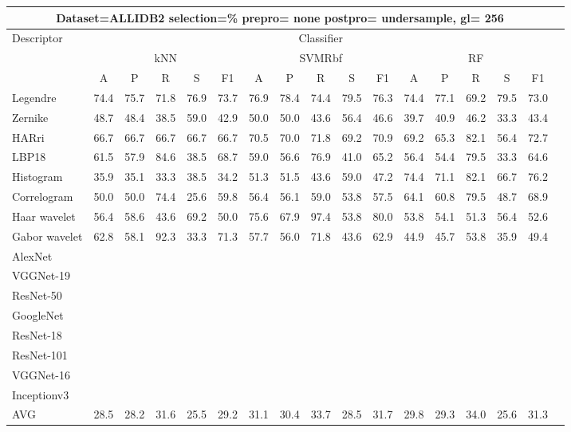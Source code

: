 \documentclass[12pt,italian]{article}
\begin{document}
\begin{tiny}
\begin{longtable}{lcccccccccccccccc}
\toprule
\multicolumn{16}{c}{Dataset=ALLIDB2 selection=\% prepro= none postpro= undersample, gl= 256} \\ 
\toprule
Descriptor & \multicolumn{15}{c}{Classifier} \\ 
& \multicolumn{5}{c}{kNN} & \multicolumn{5}{c}{SVMRbf} & \multicolumn{5}{c}{RF} \\ 
& A & P & R & S & F1 & A & P & R & S & F1 & A & P & R & S & F1 \\ 
\midrule
Legendre & 74.4 & 75.7 & 71.8 & 76.9 & 73.7 & 76.9 & 78.4 & 74.4 & 79.5 & 76.3 & 74.4 & 77.1 & 69.2 & 79.5 & 73.0 \\ 
Zernike & 48.7 & 48.4 & 38.5 & 59.0 & 42.9 & 50.0 & 50.0 & 43.6 & 56.4 & 46.6 & 39.7 & 40.9 & 46.2 & 33.3 & 43.4 \\ 
HARri & 66.7 & 66.7 & 66.7 & 66.7 & 66.7 & 70.5 & 70.0 & 71.8 & 69.2 & 70.9 & 69.2 & 65.3 & 82.1 & 56.4 & 72.7 \\ 
LBP18 & 61.5 & 57.9 & 84.6 & 38.5 & 68.7 & 59.0 & 56.6 & 76.9 & 41.0 & 65.2 & 56.4 & 54.4 & 79.5 & 33.3 & 64.6 \\ 
Histogram & 35.9 & 35.1 & 33.3 & 38.5 & 34.2 & 51.3 & 51.5 & 43.6 & 59.0 & 47.2 & 74.4 & 71.1 & 82.1 & 66.7 & 76.2 \\ 
Correlogram & 50.0 & 50.0 & 74.4 & 25.6 & 59.8 & 56.4 & 56.1 & 59.0 & 53.8 & 57.5 & 64.1 & 60.8 & 79.5 & 48.7 & 68.9 \\ 
Haar wavelet & 56.4 & 58.6 & 43.6 & 69.2 & 50.0 & 75.6 & 67.9 & 97.4 & 53.8 & 80.0 & 53.8 & 54.1 & 51.3 & 56.4 & 52.6 \\ 
Gabor wavelet & 62.8 & 58.1 & 92.3 & 33.3 & 71.3 & 57.7 & 56.0 & 71.8 & 43.6 & 62.9 & 44.9 & 45.7 & 53.8 & 35.9 & 49.4 \\ 
AlexNet \\ 
VGGNet-19 \\ 
ResNet-50 \\ 
GoogleNet \\ 
ResNet-18 \\ 
ResNet-101 \\ 
VGGNet-16 \\ 
Inceptionv3 \\ 
\hline
AVG & 28.5 & 28.2 & 31.6 & 25.5 & 29.2 & 31.1 & 30.4 & 33.7 & 28.5 & 31.7 & 29.8 & 29.3 & 34.0 & 25.6 & 31.3 \\ 
\hline
\bottomrule
\end{longtable} 


\end{tiny}
\end{document}

